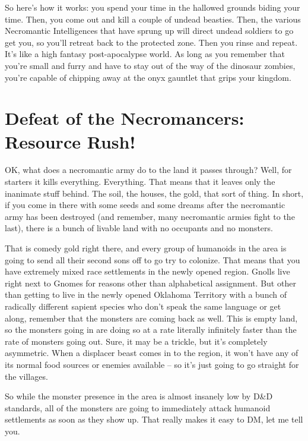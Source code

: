 So here's how it works: you spend your time in the hallowed grounds biding your time. Then, you come out and kill a couple of undead beasties. Then, the various Necromantic Intelligences that have sprung up will direct undead soldiers to go get you, so you'll retreat back to the protected zone. Then you rinse and repeat. It's like a high fantasy post-apocalypse world. As long as you remember that you're small and furry and have to stay out of the way of the dinosaur zombies, you're capable of chipping away at the onyx gauntlet that grips your kingdom.

\section{Defeat of the Necromancers: Resource Rush!}

OK, what does a necromantic army do to the land it passes through? Well, for starters it kills everything. Everything. That means that it leaves only the inanimate stuff behind. The soil, the houses, the gold, that sort of thing. In short, if you come in there with some seeds and some dreams after the necromantic army has been destroyed (and remember, many necromantic armies fight to the last), there is a bunch of livable land with no occupants and no monsters.

That is comedy gold right there, and every group of humanoids in the area is going to send all their second sons off to go try to colonize. That means that you have extremely mixed race settlements in the newly opened region. Gnolls live right next to Gnomes for reasons other than alphabetical assignment. But other than getting to live in the newly opened Oklahoma Territory with a bunch of radically different sapient species who don't speak the same language or get along, remember that the monsters are coming back as well. This is empty land, so the monsters going in are doing so at a rate literally infinitely faster than the rate of monsters going out. Sure, it may be a trickle, but it's completely asymmetric. When a displacer beast comes in to the region, it won't have any of its normal food sources or enemies available -- so it's just going to go straight for the villages.

So while the monster presence in the area is almost insanely low by D\&D standards, all of the monsters are going to immediately attack humanoid settlements as soon as they show up. That really makes it easy to DM, let me tell you.
